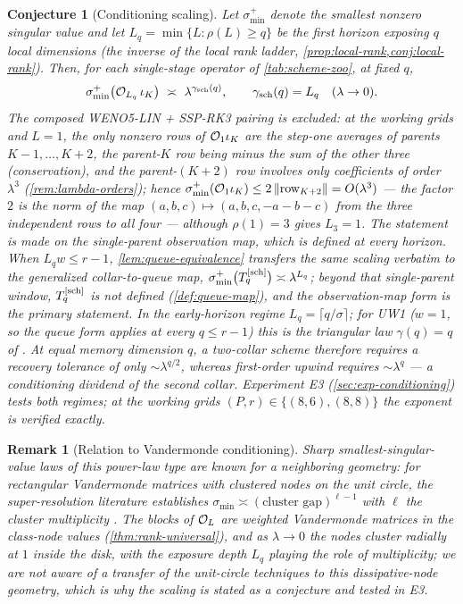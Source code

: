 \documentclass[pdflatex,sn-mathphys-num]{sn-jnl}%
\theoremstyle{thmstyleone}%
\newtheorem{conjecture}{Conjecture}%
\theoremstyle{thmstyletwo}%
\newtheorem{remark}{Remark}%
\theoremstyle{thmstylethree}%
\newcommand{\OL}{{\cal O}_L}
\begin{document}
\begin{conjecture}[Conditioning scaling]\label{conj:conditioning}
Let $\sigma^{+}_{\min}$ denote the smallest \emph{nonzero} singular value and let $L_q=\min\{L:\rho(L)\ge q\}$ be the first horizon exposing $q$ local dimensions (the inverse of the local rank ladder, \cref{prop:local-rank,conj:local-rank}).
Then, for each single-stage operator of \cref{tab:scheme-zoo}, at fixed $q$, \[ \sigma^{+}_{\min}\bigl({\cal O}_{L_q}\,\iota_K\bigr) \ \asymp\ \lambda^{\gamma_{\rm sch}(q)}, \qquad \gamma_{\rm sch}(q)=L_q \quad(\lambda\to0). \]
The composed WENO5-LIN + SSP-RK3 pairing is excluded: at the working grids and $L=1$, the only nonzero rows of ${\cal O}_1\iota_K$ are the step-one averages of parents $K-1,\dots,K+2$, the parent-$K$ row being minus the sum of the other three (conservation), and the parent-$(K+2)$ row involves only coefficients of order $\lambda^{3}$ (\cref{rem:lambda-orders}); hence $\sigma^{+}_{\min}({\cal O}_1\iota_K)\le2\,\|\text{row}_{K+2}\|=O(\lambda^{3})$ --- the factor $2$ is the norm of the map $(a,b,c)\mapsto(a,b,c,-a-b-c)$ from the three independent rows to all four --- although $\rho(1)=3$ gives $L_3=1$.
The statement is made on the single-parent observation map, which is defined at every horizon.
When $L_qw\le r-1$, \cref{lem:queue-equivalence} transfers the same scaling verbatim to the generalized collar-to-queue map, $\sigma^{+}_{\min}\bigl(T^{[\rm sch]}_q\bigr)\asymp\lambda^{L_q}$; beyond that single-parent window, $T^{[\rm sch]}_q$ is not defined (\cref{def:queue-map}), and the observation-map form is the primary statement.
In the early-horizon regime $L_q=\lceil q/\sigma\rceil$; for UW1 ($w=1$, so the queue form applies at every $q\le r-1$) this is the triangular law $\gamma(q)=q$ of \cite{PolemitisChristakisDrikakis2026FVerasure}.
At equal memory dimension $q$, a two-collar scheme therefore requires a recovery tolerance of only $\sim\lambda^{q/2}$, whereas first-order upwind requires $\sim\lambda^{q}$ --- a conditioning dividend of the second collar.
Experiment E3 (\cref{sec:exp-conditioning}) tests both regimes; at the working grids $(P,r)\in\{(8,6),(8,8)\}$ the exponent is verified exactly.
\end{conjecture}

\begin{remark}[Relation to Vandermonde conditioning]\label{rem:vandermonde-prior}
Sharp smallest-singular-value laws of this power-law type are known for a neighboring geometry: for rectangular Vandermonde matrices with \emph{clustered nodes on the unit circle}, the super-resolution literature establishes $\sigma_{\min}\asymp(\text{cluster gap})^{\ell-1}$ with $\ell$ the cluster multiplicity \cite{BatenkovDemanetGoldmanYomdin2020}.
The blocks of $\OL$ are weighted Vandermonde matrices in the class-node values (\cref{thm:rank-universal}), and as $\lambda\to0$ the nodes cluster \emph{radially} at $1$ inside the disk, with the exposure depth $L_q$ playing the role of multiplicity; we are not aware of a transfer of the unit-circle techniques to this dissipative-node geometry, which is why the scaling is stated as a conjecture and tested in E3.
\end{remark}
\end{document}
